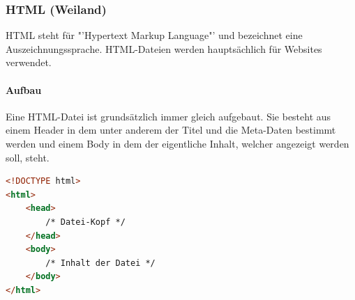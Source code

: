 \subsubsection{HTML (Weiland)}

HTML steht für "'Hypertext Markup Language"' und bezeichnet eine Auszeichnungssprache. HTML-Dateien werden hauptsächlich für Websites verwendet.


\paragraph{Aufbau}

Eine HTML-Datei ist grundsätzlich immer gleich aufgebaut. Sie besteht aus einem Header in dem unter anderem der Titel und die Meta-Daten bestimmt werden und einem Body in dem der eigentliche Inhalt, welcher angezeigt werden soll, steht.
\begin{lstlisting}[style=custom, language=HTML, caption={HTML-Tags}]
<!DOCTYPE html>
<html> 
	<head>
		/* Datei-Kopf */
	</head>
	<body>
		/* Inhalt der Datei */
	</body>
</html>
\end{lstlisting}


